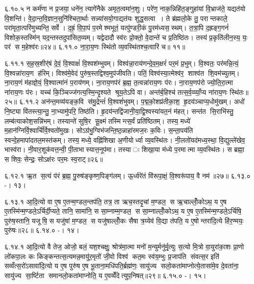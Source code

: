 ६.१०.५
न कर्म॑णा न प्र॒जया॒ धने॑न॒ त्यागे॑नैके अमृत॒त्वमा॑न॒शुः। परे॑ण॒ नाक॒न्निहि॑त॒ङ्गुहा॑यां  वि॒भ्राज॑ते॒ यद्यत॑यो वि॒शन्ति॑। वे॒दा॒न्त॒वि॒ज्ञान॒सुनि॑श्चिता॒र्थाः सन्न्या॑सयो॒गाद्यत॑यः  शुद्ध॒सत्वा। ते ब्र॑ह्मलो॒के तु॒ परान्तकाले॒ परा॑मृता॒त्परि॑मुच्यन्ति॒ सर्वे। द॒ह्रं॒  वि॒पा॒पं प॒रमेश्मभूतं॒ यत्पु॑ण्डरी॒कं पु॒रम॑ध्यस॒स्थम्। त॒त्रा॒पि द॒ह्रङ्ग॒गनं॑  विशोक॒स्तस्मि॑न् यद॒न्तस्तदुपा॑सित॒व्यम्। यद्वेदादौ स्व॑रः प्रो॒क्तो॒ वे॒दान्ते॑ च प्र॒तिष्ठि॑तः। तस्य॑ प्र॒कृति॑लीन॒स्य॒ यः॒ पर॑ स म॒हेश्व॑रः॥२४॥
६.११.०
ना॒रा॒य॒णः स्थि॑तो व्य॒वस्थि॑तश्च॒त्वारि॑ च॥ ११॥
\anuvakamend

६.११.१
स॒ह॒स्र॒शीर्॑षं  दे॒वं॒  वि॒श्वाक्षं॑  वि॒श्वश॑म्भुवम्। विश्व॑न्ना॒राय॑णन्दे॒व॒म॒क्षरं॑ पर॒मं प्र॒भुम्। वि॒श्वतः॒ पर॑मन्नि॒त्यं॒  वि॒श्वन्ना॑राय॒ण ह॑रिम्। विश्व॑मे॒वेदं पुरु॑ष॒स्तद्विश्व॒मुप॑जीवति। पतिं॒  विश्व॑स्या॒त्मेश्व॑र॒ शाश्व॑त शि॒वम॑च्युतम्। ना॒राय॒णं म॑हाज्ञे॒यं॒  वि॒श्वात्मा॑नं प॒राय॑णम्। ना॒राय॒णप॑रं ब्र॒ह्म॒ त॒त्वन्ना॑राय॒णः प॑रः। ना॒राय॒णप॑रो ज्यो॒ति॒रा॒त्मा ना॑राय॒णः प॑रः। यच्च॑ कि॒ञ्चिज्ज॑गत्य॒स्मि॒न्दृ॒श्यते श्रूय॒तेऽपि॑ वा। अन्त॑र्ब॒हिश्च॑ तत्स॒र्व॒व्व्याँ॒प्य ना॑राय॒णः स्थि॑तः॥२५॥
६.११.२
अन॑न्त॒मव्य॑यङ्क॒वि स॑मु॒द्रेन्तं॑  वि॒श्वशं॑भुवम्। प॒द्म॒को॒शप्र॑तीका॒श॒ हृ॒दय॑ञ्चाप्य॒धोमु॑खम्। अधो॑ नि॒ष्ट्या वि॑तस्त्या॒न्तु॒ ना॒भ्यामु॑परि॒ तिष्ठ॑ति। हृ॒दय॑न्तद्वि॑जानी॒या॒द्वि॒श्वस्या॑यत॒नं म॑हत्। सन्त॑त सि॒राभि॑स्तु॒ लम्ब॑त्याकोश॒सन्नि॑भम्। तस्यान्ते॑ सुषि॒र सू॒क्ष्मं तस्मिन्त्स॒र्वं प्रति॑ष्ठितम्। तस्य॒ मध्ये॑ म॒हान॑ग्निर्वि॒श्वार्चि॑र्वि॒श्वतो॑मुखः। सोऽग्र॑भु॒ग्विभ॑जन्ति॒ष्ठ॒न्नाहा॑रमज॒रः क॒विः। स॒न्ता॒पय॑ति स्वन्दे॒हमापा॑दतल॒मस्त॑कम्। तस्य॒ मध्ये॒ वह्नि॑शिखा अ॒णीयोर्ध्वा व्य॒वस्थि॑तः। नी॒लतो॑यद॑मध्य॒स्था॒ वि॒द्युल्ले॑खेव॒ भास्व॑रा। नी॒वार॒शूक॑वत्त॒न्वी॒ पी॒ताभास्यात्त॒नूप॑मा। तस्याः  शिखा॒या म॑ध्ये प॒रमात्मा व्य॒वस्थि॑तः। स ब्रह्मा॒ स शिवः॒ सेन्द्रः॒ सोऽक्ष॑रः पर॒मः स्व॒राट्॥२६॥
\anuvakamend

६.१२.१
ऋ॒त स॒त्यं प॑रं ब्र॒ह्म॒ पु॒रुष॑ङ्कृष्ण॒पिङ्ग॑लम्। ऊ॒र्ध्वरे॑तं  वि॑रूपा॒क्षं॒  वि॒श्वरू॑पाय॒ वै नम॑॥२७॥%
६.१३.०
-। १३।
\anuvakamend

६.१३.१
आ॒दि॒त्यो वा ए॒ष ए॒तन्म॒ण्डल॒न्तप॑ति॒ तत्र॒ ता ऋच॒स्तदृ॒चां म॒ण्डल॒ स ऋ॒चाल्लोँ॒कोऽथ॒ य ए॒ष ए॒तस्मि॑न्म॒ण्डले॒ऽर्चिर्दी॒प्यते॒ तानि॒ सामा॑नि॒ स सा॒म्नाम्म॒ण्डल॒ स सा॒म्नाल्लोँ॒कोऽथ॒ य ए॒ष ए॒तस्मि॑न्म॒ण्डले॒ऽर्चिषि॒ पुरु॑ष॒स्तानि॒ यजूषि॒ स यजु॑षां म॒ण्डल॒ स यजु॑षाल्लोँ॒कः सैषा त्र॒य्येव॑ वि॒द्या त॑पति॒ य ए॒षोन्तरा॑दि॒त्ये हि॑र॒ण्मयः॒ पुरु॑षः॥२८॥
६.१४.०
-। १४।
\anuvakamend

६.१४.१
आ॒दि॒त्यो वै तेज॒ ओजो॒ बलं॒ यश॒श्चक्षुः॒ श्रोत्र॑मा॒त्मा मनो॑ म॒न्युर्मनु॑र्मृ॒त्युः स॒त्यो मि॒त्रो वा॒युरा॑का॒शः प्रा॒णो लो॑कपा॒लः कः किङ्कन्तत्स॒त्यमन्न॒मायु॑र॒मृतो॑ जी॒वो विश्व॑ कत॒मः स्व॑य॒म्भुः प्र॒जाप॑ति संवत्स॒र इति॑ सव्वँत्स॒रो॑ऽसावा॑दि॒त्यो य ए॒ष पुरु॑ष ए॒ष भू॒ताना॒मधि॑पति॒र्ब्रह्म॑णः॒ सायु॑ज्य सलो॒कता॑माप्नोत्ये॒तासा॑मे॒व दे॒वता॑ना॒ सायु॑ज्य सा॒र्ष्टिता समानलो॒कता॑माप्नोति॒ य ए॒वव्वेँदेत्युप॒निषत्॥२९॥
६.१५.०
-। १५।
\anuvakamend

